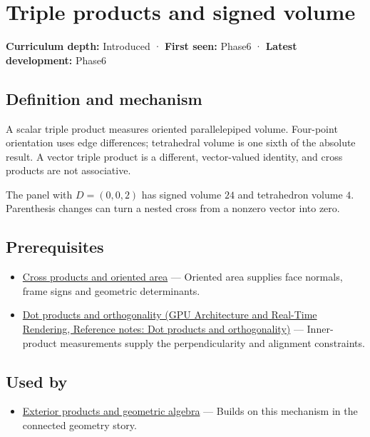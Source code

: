 \hypertarget{appendix-5caa058bd9c7}{}\label{referencestart:appendix-5caa058bd9c7}
\section{Triple products and signed volume}\label{appendix-5caa058bd9c7-triple-products-and-signed-volume}

\textbf{Curriculum depth:} Introduced · \textbf{First seen:} Phase6 · \textbf{Latest development:} Phase6

\subsection{Definition and mechanism}\label{appendix-5caa058bd9c7-definition-and-mechanism}

A scalar triple product measures oriented parallelepiped volume. Four-point orientation uses edge differences; tetrahedral volume is one sixth of the absolute result. A vector triple product is a different, vector-valued identity, and cross products are not associative.

The panel with \(D=(0,0,2)\) has signed volume \(24\) and tetrahedron volume \(4\). Parenthesis changes can turn a nested cross from a nonzero vector into zero.

\subsection{Prerequisites}\label{appendix-5caa058bd9c7-prerequisites}

\begin{itemize}
\tightlist
\item
  \hyperref[appendix-2391db8052b1]{Cross products and oriented area} --- Oriented area supplies face normals, frame signs and geometric determinants.
\item
  \href{../06-GPU-Architecture-and-Real-Time-Rendering/main.pdf\#nameddest=appendix-8bc4e8fc547c}{Dot products and orthogonality (GPU Architecture and Real-Time Rendering, Reference notes: Dot products and orthogonality)} --- Inner-product measurements supply the perpendicularity and alignment constraints.
\end{itemize}

\subsection{Used by}\label{appendix-5caa058bd9c7-used-by}

\begin{itemize}
\tightlist
\item
  \hyperref[appendix-e1960925d1b8]{Exterior products and geometric algebra} --- Builds on this mechanism in the connected geometry story.
\end{itemize}


